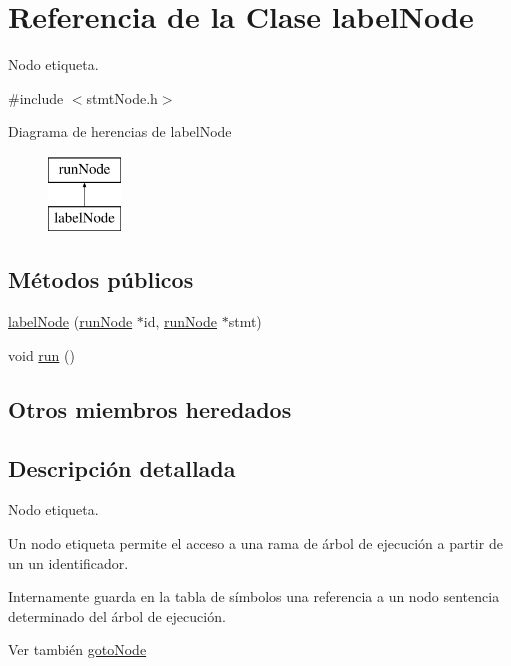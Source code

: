 \hypertarget{classlabelNode}{\section{Referencia de la Clase label\-Node}
\label{classlabelNode}
}


Nodo etiqueta.  




{\ttfamily \#include $<$stmt\-Node.\-h$>$}

Diagrama de herencias de label\-Node\begin{figure}[H]
\begin{center}
\leavevmode
\includegraphics[height=2.000000cm]{classlabelNode}
\end{center}
\end{figure}
\subsection*{Métodos públicos}
\begin{DoxyCompactItemize}
\item 
\hyperlink{classlabelNode_acdb0918db9375b2784b00867537d0a37}{label\-Node} (\hyperlink{classrunNode}{run\-Node} $\ast$id, \hyperlink{classrunNode}{run\-Node} $\ast$stmt)
\item 
void \hyperlink{classlabelNode_a9906fc4f7d7088d6ea52660f8e036b41}{run} ()
\end{DoxyCompactItemize}
\subsection*{Otros miembros heredados}


\subsection{Descripción detallada}
Nodo etiqueta. 

Un nodo etiqueta permite el acceso a una rama de árbol de ejecución a partir de un un identificador.

Internamente guarda en la tabla de símbolos una referencia a un nodo sentencia determinado del árbol de ejecución.

\begin{DoxySeeAlso}{Ver también}
\hyperlink{classgotoNode}{goto\-Node} 
\end{DoxySeeAlso}


